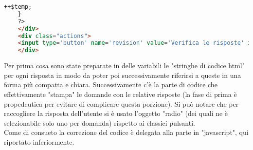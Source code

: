 \begin{lstlisting}[language=html]
		++$temp;
	}
	?>
	</div>
	<div class="actions">
	<input type='button' name='revision' value='Verifica le risposte' id='revision' onclick='check()'/>
	</div>
\end{lstlisting}

Per prima cosa sono state preparate in delle variabili le "stringhe di codice html" per ogni risposta in modo da poter poi successivamente riferirsi a queste in una forma più compatta e chiara. Successivamente c'è la parte di codice che effettivamente "stampa" le domande con le relative risposte (la fase di prima è propedeutica per evitare di complicare questa porzione). Si può notare che per raccogliere la risposta dell'utente si è usato l'oggetto "radio" (dei quali ne è selezionabile solo uno per domanda) rispetto ai classici pulsanti.\\ 
Come di consueto la correzione del codice è delegata alla parte in "javascript", qui riportato inferiormente.\\

